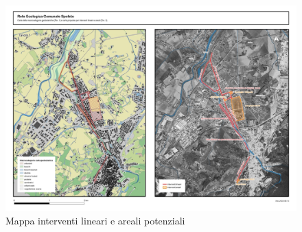 \documentclass[
  a4paper,
]{book}
\begin{document}
\begin{figure}

{\centering \includegraphics[width=\linewidth]{./figs/agendaUrbana/tavolaAgendaUrbana20240813} 

}

\caption{Mappa interventi lineari e areali potenziali}\label{fig:agUintevFocus}
\end{figure}
\end{document}
